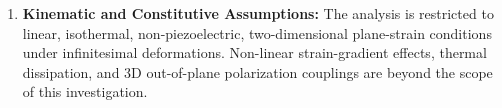 \begin{enumerate}
  \item \textbf{Kinematic and Constitutive Assumptions:}
  The analysis is restricted to linear, isothermal, non-piezoelectric, two-dimensional plane-strain conditions under infinitesimal deformations. Non-linear strain-gradient effects, thermal dissipation, and 3D out-of-plane polarization couplings are beyond the scope of this investigation.
\end{enumerate}
